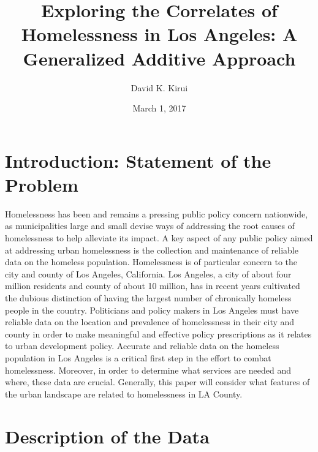 \documentclass[titlepage]{article}   	%
\title{Exploring the Correlates of Homelessness in Los Angeles: A Generalized Additive Approach}
\author{David K. Kirui}
\date{March 1, 2017}							%
\begin{document}
\maketitle{}
\section{Introduction: Statement of the Problem}

\setlength{\parindent}{10ex} 
Homelessness has been and remains a pressing public policy concern nationwide, as municipalities large and small devise ways of addressing the root causes of homelessness to help alleviate its impact. A key aspect of any public policy aimed at addressing urban homelessness is the collection and maintenance of reliable data on the homeless population. Homelessness is of particular concern to the city and county of Los Angeles, California. Los Angeles, a city of about four million residents and county of about 10 million, has in recent years cultivated the dubious distinction of having the largest number of chronically homeless people in the country. Politicians and policy makers in Los Angeles must have reliable data on the location and prevalence of homelessness in their city and county in order to make meaningful and effective policy prescriptions as it relates to urban development policy. Accurate and reliable data on the homeless population in Los Angeles is a critical first step in the effort to combat homelessness. Moreover, in order to determine what services are needed and where, these data are crucial. Generally, this paper will consider what features of the urban landscape are related to homelessness in LA County. 

\section{Description of the Data}
\end{document}
